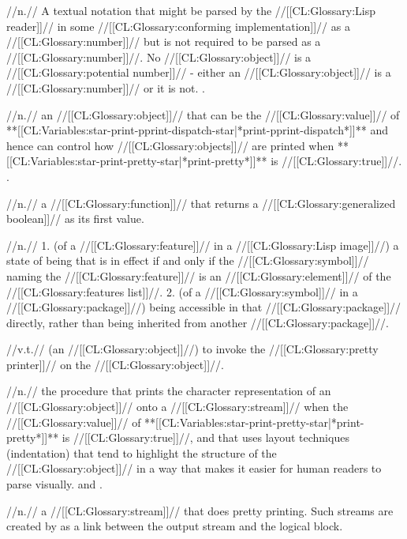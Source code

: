  //n.// A textual notation that might be parsed by the //[[CL:Glossary:Lisp reader]]// in some //[[CL:Glossary:conforming implementation]]// as a //[[CL:Glossary:number]]// but is not required to be parsed as a //[[CL:Glossary:number]]//. No //[[CL:Glossary:object]]// is a //[[CL:Glossary:potential number]]// - either an //[[CL:Glossary:object]]// is a //[[CL:Glossary:number]]// or it is not. \Seesection\PotentialNumbersAsTokens.

 //n.// an //[[CL:Glossary:object]]// that can be the //[[CL:Glossary:value]]// of **[[CL:Variables:star-print-pprint-dispatch-star|*print-pprint-dispatch*]]** and hence can control how //[[CL:Glossary:objects]]// are printed when **[[CL:Variables:star-print-pretty-star|*print-pretty*]]** is //[[CL:Glossary:true]]//. \Seesection\PPrintDispatchTables.

 //n.// a //[[CL:Glossary:function]]// that returns a //[[CL:Glossary:generalized boolean]]// as its first value.

 //n.// 1. (of a //[[CL:Glossary:feature]]// in a //[[CL:Glossary:Lisp image]]//) a state of being that is in effect if and only if the //[[CL:Glossary:symbol]]// naming the //[[CL:Glossary:feature]]// is an //[[CL:Glossary:element]]// of the //[[CL:Glossary:features list]]//. 2. (of a //[[CL:Glossary:symbol]]// in a //[[CL:Glossary:package]]//) being accessible in that //[[CL:Glossary:package]]// directly, rather than being inherited from another //[[CL:Glossary:package]]//.

 //v.t.// (an //[[CL:Glossary:object]]//) to invoke the //[[CL:Glossary:pretty printer]]// on the //[[CL:Glossary:object]]//.

 //n.// the procedure that prints the character representation of an //[[CL:Glossary:object]]// onto a //[[CL:Glossary:stream]]// when the //[[CL:Glossary:value]]// of **[[CL:Variables:star-print-pretty-star|*print-pretty*]]** is //[[CL:Glossary:true]]//, and that uses layout techniques (\eg indentation) that tend to highlight the structure of the //[[CL:Glossary:object]]// in a way that makes it easier for human readers to parse visually.  and \secref\PPrinter.

 //n.// a //[[CL:Glossary:stream]]// that does pretty printing. Such streams are created by  as a link between the output stream and the logical block.

